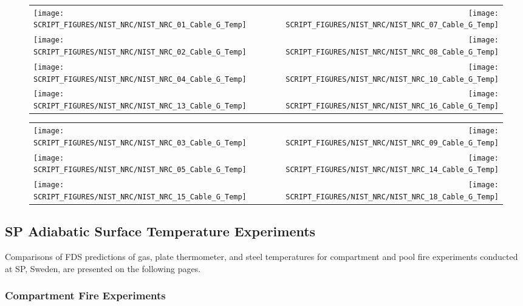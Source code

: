 \begin{figure}[p]
\begin{tabular*}{\textwidth}{l@{\extracolsep{\fill}}r}
\texttt{[image: SCRIPT\_FIGURES/NIST\_NRC/NIST\_NRC\_01\_Cable\_G\_Temp]} &
\texttt{[image: SCRIPT\_FIGURES/NIST\_NRC/NIST\_NRC\_07\_Cable\_G\_Temp]} \\
\texttt{[image: SCRIPT\_FIGURES/NIST\_NRC/NIST\_NRC\_02\_Cable\_G\_Temp]} &
\texttt{[image: SCRIPT\_FIGURES/NIST\_NRC/NIST\_NRC\_08\_Cable\_G\_Temp]} \\
\texttt{[image: SCRIPT\_FIGURES/NIST\_NRC/NIST\_NRC\_04\_Cable\_G\_Temp]} &
\texttt{[image: SCRIPT\_FIGURES/NIST\_NRC/NIST\_NRC\_10\_Cable\_G\_Temp]} \\
\texttt{[image: SCRIPT\_FIGURES/NIST\_NRC/NIST\_NRC\_13\_Cable\_G\_Temp]} &
\texttt{[image: SCRIPT\_FIGURES/NIST\_NRC/NIST\_NRC\_16\_Cable\_G\_Temp]}
\end{tabular*}
\label{NIST_NRC_Cable_G_Closed}
\end{figure}

\begin{figure}[p]
\begin{tabular*}{\textwidth}{l@{\extracolsep{\fill}}r}
\texttt{[image: SCRIPT\_FIGURES/NIST\_NRC/NIST\_NRC\_03\_Cable\_G\_Temp]} &
\texttt{[image: SCRIPT\_FIGURES/NIST\_NRC/NIST\_NRC\_09\_Cable\_G\_Temp]} \\
\texttt{[image: SCRIPT\_FIGURES/NIST\_NRC/NIST\_NRC\_05\_Cable\_G\_Temp]} &
\texttt{[image: SCRIPT\_FIGURES/NIST\_NRC/NIST\_NRC\_14\_Cable\_G\_Temp]} \\
\texttt{[image: SCRIPT\_FIGURES/NIST\_NRC/NIST\_NRC\_15\_Cable\_G\_Temp]} &
\texttt{[image: SCRIPT\_FIGURES/NIST\_NRC/NIST\_NRC\_18\_Cable\_G\_Temp]}
\end{tabular*}
\label{NIST_NRC_Cable_G_Open}
\end{figure}

\clearpage

\subsection{SP Adiabatic Surface Temperature Experiments}

Comparisons of FDS predictions of gas, plate thermometer, and steel temperatures for compartment and pool fire experiments conducted at SP, Sweden, are
presented on the following pages.

\subsubsection{Compartment Fire Experiments}


